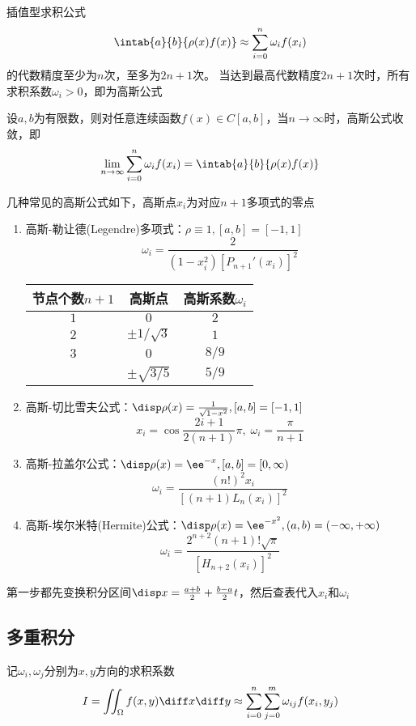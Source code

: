 \begin{theorem}
    插值型求积公式
    \[\intab{a}{b}{\rho(x)f(x)}\approx\sum_{i=0}^n\omega_if(x_i)\]
    的代数精度至少为$n$次，至多为$2n+1$次。
    当达到最高代数精度$2n+1$次时，所有求积系数$\omega_i>0$，即为高斯公式
\end{theorem}

\begin{theorem}
    设$a,b$为有限数，则对任意连续函数$f(x)\in C[a,b]$，当$n\to\infty$时，高斯公式收敛，即
    \[\lim_{n\to\infty}\sum_{i=0}^n\omega_i f(x_i)=\intab{a}{b}{\rho(x)f(x)}\]
\end{theorem}

几种常见的高斯公式如下，高斯点$x_i$为对应$n+1$多项式的零点
\begin{enumerate}
    \item 高斯-勒让德(Legendre)多项式：$\rho\equiv 1,[a,b]=[-1,1]$
    \[\omega_i=\frac{2}{(1-x_i^2)[P_{n+1}'(x_i)]^2}\]
    \begin{center}
        \begin{tabular}{ccc}\hline
            节点个数$n+1$ & 高斯点 & 高斯系数$\omega_i$\\\hline
            $1$ & $0$ & $2$\\\hline
            $2$ & $\pm 1/\sqrt{3}$ & $1$\\\hline
            $3$ & $0$ & $8/9$\\
            & $\pm \sqrt{3/5}$ & $5/9$\\\hline
        \end{tabular}
    \end{center}
    \item 高斯-切比雪夫公式：$\disp \rho(x)=\frac{1}{\sqrt{1-x^2}},[a,b]=[-1,1]$
    \[x_i=\cos\frac{2i+1}{2(n+1)}\pi,\;\omega_i=\frac{\pi}{n+1}\]
    \item 高斯-拉盖尔公式：$\disp \rho(x)=\ee^{-x},[a,b]=[0,\infty)$
    \[\omega_i=\frac{(n!)^2x_i}{[(n+1)L_n(x_i)]^2}\]
    \item 高斯-埃尔米特(Hermite)公式：$\disp \rho(x)=\ee^{-x^2},(a,b)=(-\infty,+\infty)$
    \[\omega_i=\frac{2^{n+2}(n+1)!\sqrt{\pi}}{[H_{n+2}(x_i)]^2}\]
\end{enumerate}
第一步都先变换积分区间$\disp x=\frac{a+b}{2}+\frac{b-a}{2}t$，然后查表代入$x_i$和$\omega_i$

\subsection{多重积分}
记$\omega_i,\omega_j$分别为$x,y$方向的求积系数
\[I=\iint_\Omega f(x,y)\diff x\diff y\approx\sum_{i=0}^n\sum_{j=0}^m\omega_{ij}f(x_i,y_j)\]

